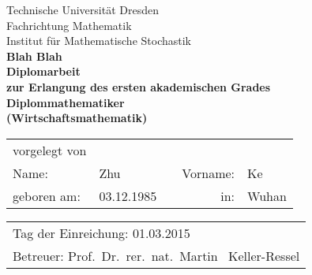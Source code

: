 \begin{titlepage}
	\begin{center}
		\Huge
		Technische Universit\"at Dresden \\[-.4em]
		Fachrichtung Mathematik \\[.5em]
		\Large
		Institut f\"ur Mathematische Stochastik \\[4em]
		\bfseries\huge
		 Blah Blah\\[3em]
		\normalfont\Large
		Diplomarbeit \\
		zur Erlangung des ersten akademischen Grades \\[.5em]
		\bfseries\Large
		Diplommathematiker\\[.5em]
	  	\bfseries\Large
		(Wirtschaftsmathematik)\\[4em]
	\end{center}
	\large
	\begin{tabular}{lllrl}
		vorgelegt von & & & & \\[1.2em]
		Name: & Zhu & \hspace{1.5cm} & Vorname: & Ke \\[.5em]
		geboren am: & 03.12.1985 & & in: & Wuhan \\[3em]
	\end{tabular}
	\newline
	\begin{tabular}{l}
		Tag der Einreichung: \hspace{.5cm} 01.03.2015 \\[.5em]
		Betreuer: \hspace{.5cm} Prof.~Dr.~rer.~nat.~Martin ~Keller-Ressel
	\end{tabular}
\end{titlepage}
\thispagestyle{empty}
\mbox{}
